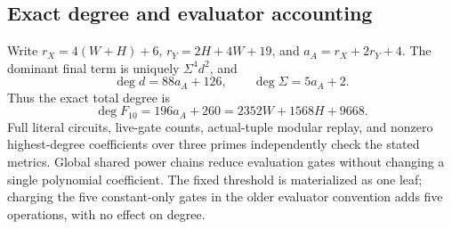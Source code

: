 \subsection{Exact degree and evaluator accounting}

Write $r_X=4(W+H)+6$, $r_Y=2H+4W+19$, and $a_A=r_X+2r_Y+4$.
The dominant final term is uniquely $\Sigma^4d^2$, and
\[
 \deg d=88a_A+126,\qquad \deg\Sigma=5a_A+2.
\]
Thus the exact total degree is
\[
 \boxed{\deg F_{10}=196a_A+260=2352W+1568H+9668.}
\]
Full literal circuits, live-gate counts, actual-tuple modular replay, and
nonzero highest-degree coefficients over three primes independently check
the stated metrics. Global shared power chains reduce evaluation gates
without changing a single polynomial coefficient. The fixed threshold is
materialized as one leaf; charging the five constant-only gates in the older
evaluator convention adds five operations, with no effect on degree.
